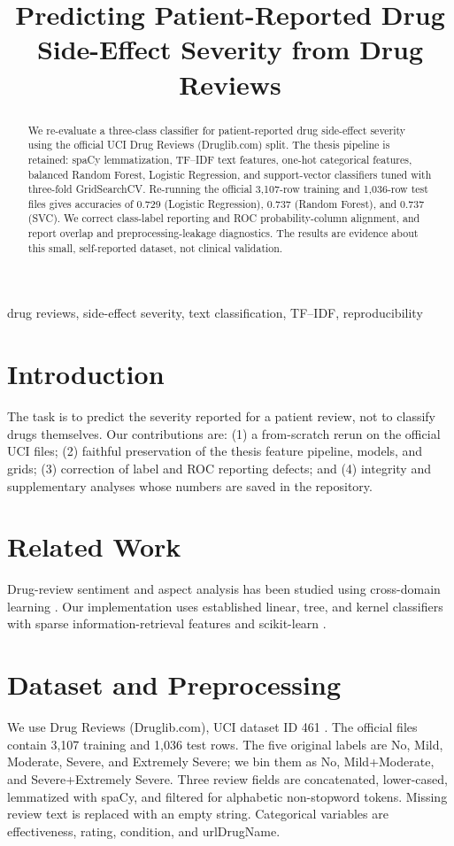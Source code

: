 \documentclass[conference]{IEEEtran}
\title{Predicting Patient-Reported Drug Side-Effect Severity from Drug Reviews}
\author{\IEEEauthorblockN{Author One and Author Two}
\IEEEauthorblockA{Department and Institution\\Venue placeholder\\email@example.com}}
\begin{document}
\maketitle

\begin{abstract}
We re-evaluate a three-class classifier for patient-reported drug side-effect severity using the official UCI Drug Reviews (Druglib.com) split. The thesis pipeline is retained: spaCy lemmatization, TF--IDF text features, one-hot categorical features, balanced Random Forest, Logistic Regression, and support-vector classifiers tuned with three-fold GridSearchCV. Re-running the official 3,107-row training and 1,036-row test files gives accuracies of 0.729 (Logistic Regression), 0.737 (Random Forest), and 0.737 (SVC). We correct class-label reporting and ROC probability-column alignment, and report overlap and preprocessing-leakage diagnostics. The results are evidence about this small, self-reported dataset, not clinical validation.
\end{abstract}
\begin{IEEEkeywords}drug reviews, side-effect severity, text classification, TF--IDF, reproducibility\end{IEEEkeywords}

\section{Introduction}
The task is to predict the severity reported for a patient review, not to classify drugs themselves. Our contributions are: (1) a from-scratch rerun on the official UCI files; (2) faithful preservation of the thesis feature pipeline, models, and grids; (3) correction of label and ROC reporting defects; and (4) integrity and supplementary analyses whose numbers are saved in the repository.

\section{Related Work}
Drug-review sentiment and aspect analysis has been studied using cross-domain learning \cite{Grasser2018}. Our implementation uses established linear, tree, and kernel classifiers \cite{Breiman2001,Cortes1995} with sparse information-retrieval features \cite{Manning2008} and scikit-learn \cite{Pedregosa2011}.

\section{Dataset and Preprocessing}
We use Drug Reviews (Druglib.com), UCI dataset ID 461 \cite{Kallumadi2018}. The official files contain 3,107 training and 1,036 test rows. The five original labels are No, Mild, Moderate, Severe, and Extremely Severe; we bin them as No, Mild+Moderate, and Severe+Extremely Severe. Three review fields are concatenated, lower-cased, lemmatized with spaCy, and filtered for alphabetic non-stopword tokens. Missing review text is replaced with an empty string. Categorical variables are effectiveness, rating, condition, and urlDrugName.
\end{document}
